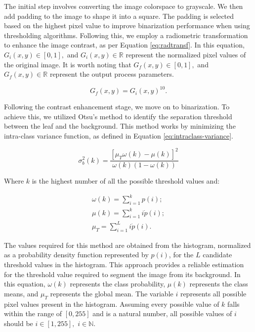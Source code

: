 The initial step involves converting the image colorspace to grayscale. We then add padding to the image to shape it into a square. The padding is selected based on the highest pixel value to improve binarization performance when using thresholding algorithms. Following this, we employ a radiometric transformation to enhance the image contrast, as per Equation \ref{eq:radtransf}. In this equation, $G_i(x,y) \in [0,1],$ and $G_i(x,y) \in \mathbb{R}$ represent the normalized pixel values of the original image. It is worth noting that $G_f(x,y) \in [0,1],$ and $G_f(x,y) \in \mathbb{R}$ represent the output process parameters.

\begin{equation}
\label{eq:radtransf}
    G_f(x,y) = G_i(x,y)^{10}.
\end{equation}

Following the contrast enhancement stage, we move on to binarization. To achieve this, we utilized Otsu's method \cite{otsu1979threshold} to identify the separation threshold between the leaf and the background. This method works by minimizing the intra-class variance function, as defined in Equation \ref{eq:intraclass-variance}.

\begin{equation}
\label{eq:intraclass-variance}
    \sigma^2_b(k) = \frac{[\mu_T\omega(k)-\mu(k)]^{2}}{\omega(k)(1-\omega(k))}
\end{equation}

Where $k$ is the highest number of all the possible threshold values and:

\begin{align}
    \omega(k) = \sum_{i = 1}^{k}p(i);\\
    \mu(k) = \sum_{i = 1}^{k}i \dot p(i);\\
    \mu_T = \sum_{i = 1}^{L}i \dot p(i).
\end{align}

The values required for this method are obtained from the histogram, normalized as a probability density function represented by $p(i)$, for the $L$ candidate threshold values in the histogram. This approach provides a reliable estimation for the threshold value required to segment the image from its background. In this equation, $\omega(k)$ represents the class probability, $\mu(k)$ represents the class means, and $\mu_T$ represents the global mean. The variable $i$ represents all possible pixel values present in the histogram. Assuming every possible value of $k$ falls within the range of $[0,255]$ and is a natural number, all possible values of $i$ should be $i \in [1,255],$ $i \in \mathbb{N}$.

